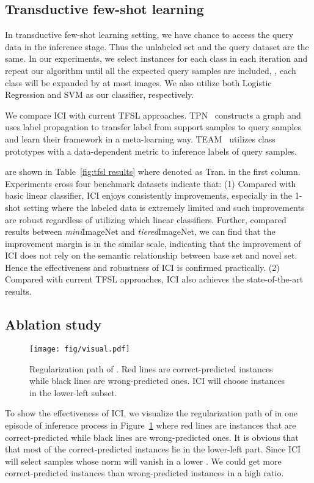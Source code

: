 \documentclass[10pt,letterpaper,twocolumn]{article}
\newcommand{\mypar}[1]{\smallskip\noindent {\bf #1}\enskip}
\begin{document}
\subsection{Transductive few-shot learning}
\mypar{Settings.} 
In transductive few-shot learning setting, we have chance to access the query data in the inference stage. 
Thus the unlabeled set and the query dataset are the same. 
In our experiments, we select  instances for each class in each iteration and repeat our algorithm until all the expected query samples are included, \ie, each class will be expanded by at most  images.
We also utilize both Logistic Regression and SVM as our classifier, respectively.

\mypar{Competitors.}
We compare ICI with current TFSL approaches. 
TPN~\cite{liu2018learning} constructs a graph and uses label propagation to transfer label from support samples to query samples and learn their framework in a meta-learning way.
TEAM~\cite{qiao2019transductive} utilizes class prototypes with a data-dependent metric to inference labels of query samples.

\mypar{Results.} are shown in Table~\ref{fig:tfsl results} where denoted as Tran. in the first column. Experiments cross four benchmark datasets indicate that:
(1) Compared with basic linear classifier, ICI enjoys consistently improvements, especially in the 1-shot setting where the labeled data is extremely limited and  such improvements are robust regardless of utilizing which linear classifiers.
Further, compared results between \emph{mini}ImageNet and \emph{tiered}ImageNet, we can find that the improvement margin is in the similar scale, indicating that the improvement of ICI does not rely on the semantic relationship between base set and novel set.
Hence the effectiveness and robustness of ICI is confirmed practically. 
(2) Compared with current TFSL approaches, ICI also achieves the state-of-the-art results.
\subsection{Ablation study\label{subsec:Ablation-Study}}
\begin{figure}[h]
\begin{centering}
\texttt{[image: fig/visual.pdf]}
\caption{\label{fig:effective}Regularization path of . Red lines are correct-predicted instances while black lines are wrong-predicted ones. ICI will choose instances in the lower-left subset.}
\end{centering}
\end{figure}
\mypar{Effectiveness of ICI.} To show the effectiveness of ICI, we visualize the regularization path of  in one episode of inference process in Figure~\ref{fig:effective} where red lines are instances that are correct-predicted while black lines are wrong-predicted ones. 
It is obvious that that most of the correct-predicted instances lie in the lower-left part. Since ICI will select samples whose norm will vanish in a lower . 
We could get more correct-predicted instances than wrong-predicted instances in a high ratio. 
\end{document}
